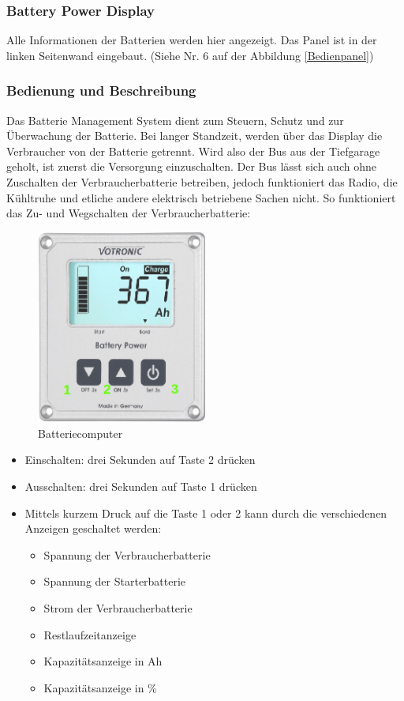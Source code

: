 \subsubsection{Battery Power Display}
Alle Informationen der Batterien werden hier angezeigt. Das Panel ist in der linken Seitenwand eingebaut. (Siehe Nr. 6 auf der  Abbildung \ref{Bedienpanel})

\subsubsection{Bedienung und Beschreibung}
Das Batterie Management System dient zum Steuern, Schutz und zur Überwachung der Batterie.
Bei langer Standzeit, werden über das Display die Verbraucher von der Batterie getrennt.
Wird also der Bus aus der Tiefgarage geholt, ist zuerst die Versorgung einzuschalten.
Der Bus lässt sich auch ohne Zuschalten der Verbraucherbatterie betreiben, jedoch funktioniert das Radio, die Kühltruhe und etliche andere elektrisch betriebene Sachen nicht.
So funktioniert das Zu- und Wegschalten der Verbraucherbatterie:

\begin{figure}[H]
	\centering
  \includegraphics[width=0.5\textwidth]{../Bilder/Anleitung/Batteriecomputer.png}
	\caption{Batteriecomputer}
    \label{Batteriecomputer}
\end{figure}


\begin{itemize}
    \item Einschalten: drei Sekunden auf Taste 2 drücken
    \item Ausschalten: drei Sekunden auf Taste 1 drücken
    \item Mittels kurzem Druck auf die Taste 1 oder 2 kann durch die verschiedenen Anzeigen geschaltet werden:
    \begin{itemize}
        \item Spannung der Verbraucherbatterie
        \item Spannung der Starterbatterie
        \item Strom der Verbraucherbatterie
        \item Restlaufzeitanzeige
        \item Kapazitätsanzeige in Ah
        \item Kapazitätsanzeige in \%
    \end{itemize}
\end{itemize}


